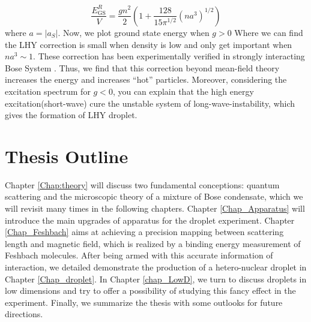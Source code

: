 \begin{equation}
\frac{E_{\text{GS}}^R}{V}=\frac{g n^2}{2}\left(1+\frac{128}{15\pi ^{1/2}} \left(n a^3\right)^{1/2}\right)
\end{equation}
where $a=\left|a_S\right|$. Now, we plot ground state energy when $g>0$
Where we can find the LHY correction is small when density is low and only get important when $n a^3\sim 1$. These correction has been experimentally verified in strongly interacting Bose System \cite{Navon2011}. Thus, we find that this correction beyond mean-field theory increases the energy and increases ``hot'' particles. Moreover, considering the excitation spectrum for $g<0$, you can explain that the high energy excitation(short-wave) cure the unstable system of long-wave-instability, which gives the formation of LHY droplet.



\section{Thesis Outline}
\label{sec:intro-outline}
Chapter \ref{Chap:theory} will discuss two fundamental conceptions: quantum scattering and the microscopic theory of a mixture of Bose condensate, which we will revisit many times in the following chapters. Chapter \ref{Chap_Apparatus} will introduce the main upgrades of apparatus for the droplet experiment. Chapter \ref{Chap_Feshbach} aims at achieving a precision mapping between scattering length and magnetic field, which is realized by a binding energy measurement of Feshbach molecules. After being armed with this accurate information of interaction, we detailed demonstrate the production of a hetero-nuclear droplet in Chapter \ref{Chap_droplet}. In Chapter \ref{chap_LowD}, we turn to discuss droplets in low dimensions and try to offer a possibility of studying this fancy effect in the experiment. Finally, we summarize the thesis with some outlooks for future directions.

\chapterend
